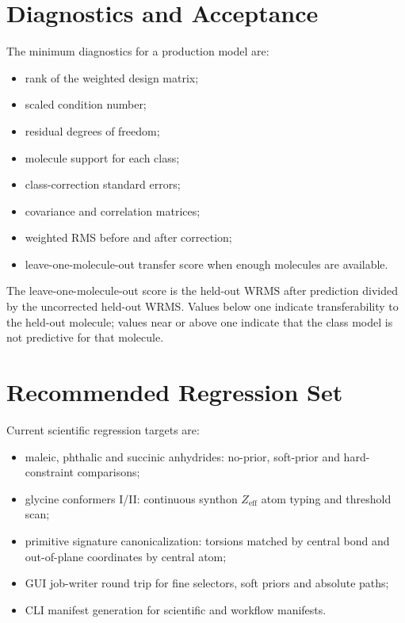 \documentclass[11pt]{article}
\newcommand{\zeff}{Z_\mathrm{eff}}
\begin{document}
\section{Diagnostics and Acceptance}

The minimum diagnostics for a production model are:

\begin{itemize}
  \item rank of the weighted design matrix;
  \item scaled condition number;
  \item residual degrees of freedom;
  \item molecule support for each class;
  \item class-correction standard errors;
  \item covariance and correlation matrices;
  \item weighted RMS before and after correction;
  \item leave-one-molecule-out transfer score when enough molecules are
        available.
\end{itemize}

\noindent
The leave-one-molecule-out score is the held-out WRMS after prediction divided
by the uncorrected held-out WRMS.  Values below one indicate transferability to
the held-out molecule; values near or above one indicate that the class model is
not predictive for that molecule.

\section{Recommended Regression Set}

Current scientific regression targets are:

\begin{itemize}
  \item maleic, phthalic and succinic anhydrides: no-prior, soft-prior and
        hard-constraint comparisons;
  \item glycine conformers I/II: continuous synthon \(\zeff\) atom typing and
        threshold scan;
  \item primitive signature canonicalization: torsions matched by central bond
        and out-of-plane coordinates by central atom;
  \item GUI job-writer round trip for fine selectors, soft priors and absolute
        paths;
  \item CLI manifest generation for scientific and workflow manifests.
\end{itemize}
\end{document}
